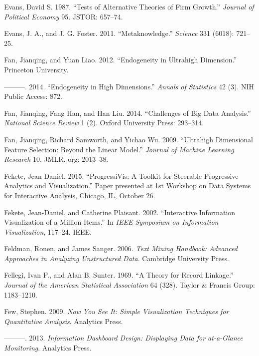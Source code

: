 \documentclass[]{krantz}
\begin{document}
\hypertarget{ref-evans1987tests}{}
Evans, David S. 1987. ``Tests of Alternative Theories of Firm Growth.''
\emph{Journal of Political Economy} 95. JSTOR: 657--74.

\hypertarget{ref-Evans2011}{}
Evans, J. A., and J. G. Foster. 2011. ``Metaknowledge.'' \emph{Science}
331 (6018): 721--25.

\hypertarget{ref-FanLiao2012}{}
Fan, Jianqing, and Yuan Liao. 2012. ``Endogeneity in Ultrahigh
Dimension.'' Princeton University.

\hypertarget{ref-fan2014endogeneity}{}
---------. 2014. ``Endogeneity in High Dimensions.'' \emph{Annals of
Statistics} 42 (3). NIH Public Access: 872.

\hypertarget{ref-fan2014challenges}{}
Fan, Jianqing, Fang Han, and Han Liu. 2014. ``Challenges of Big Data
Analysis.'' \emph{National Science Review} 1 (2). Oxford University
Press: 293--314.

\hypertarget{ref-fan2009ultrahigh}{}
Fan, Jianqing, Richard Samworth, and Yichao Wu. 2009. ``Ultrahigh
Dimensional Feature Selection: Beyond the Linear Model.'' \emph{Journal
of Machine Learning Research} 10. JMLR. org: 2013--38.

\hypertarget{ref-fekete2015progressivis}{}
Fekete, Jean-Daniel. 2015. ``ProgressiVis: A Toolkit for Steerable
Progressive Analytics and Visualization.'' Paper presented at 1st
Workshop on Data Systems for Interactive Analysis, Chicago, IL, October
26.

\hypertarget{ref-fekete2002interactive}{}
Fekete, Jean-Daniel, and Catherine Plaisant. 2002. ``Interactive
Information Visualization of a Million Items.'' In \emph{IEEE Symposium
on Information Visualization}, 117--24. IEEE.

\hypertarget{ref-FeldmanSanger}{}
Feldman, Ronen, and James Sanger. 2006. \emph{Text Mining Handbook:
Advanced Approaches in Analyzing Unstructured Data}. Cambridge
University Press.

\hypertarget{ref-FS69}{}
Fellegi, Ivan P., and Alan B. Sunter. 1969. ``A Theory for Record
Linkage.'' \emph{Journal of the American Statistical Association} 64
(328). Taylor \& Francis Group: 1183--1210.

\hypertarget{ref-few2009now}{}
Few, Stephen. 2009. \emph{Now You See It: Simple Visualization
Techniques for Quantitative Analysis}. Analytics Press.

\hypertarget{ref-few2013information}{}
---------. 2013. \emph{Information Dashboard Design: Displaying Data for
at-a-Glance Monitoring}. Analytics Press.
\end{document}
